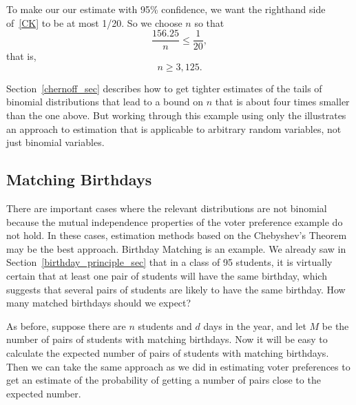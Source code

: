 To make our our estimate with 95\% confidence, we want the righthand
side of~\eqref{CK} to be at most 1/20.  So we choose $n$ so that
\[
\frac{156.25}{n} \leq \frac{1}{20},
\]
that is,
\[
n \geq 3,125.
\]

Section~\ref{chernoff_sec} describes how to get tighter estimates of
the tails of binomial distributions that lead to a bound on $n$ that
is about four times smaller than the one above.  But working through
this example using only the  illustrates an approach to
estimation that is applicable to arbitrary random variables, not just
binomial variables.  \iffalse , and it did lead to a feasible, though
larger than necessary, sample size.\fi

\subsection{Matching Birthdays}\label{bday_deviation_subsec}

There are important cases where the relevant distributions are not
binomial because the mutual independence properties of the voter
preference example do not hold.  In these cases, estimation methods
based on the Chebyshev's Theorem may be the best approach.  Birthday
Matching is an example.  We already saw in
Section~\ref{birthday_principle_sec} that in a class of 95 students,
it is virtually certain that at least one pair of students will have
the same birthday, which suggests that several pairs of students are
likely to have the same birthday.  How many matched birthdays should
we expect?

As before, suppose there are $n$ students and $d$ days in the year,
and let $M$ be the number of pairs of students with matching birthdays.
Now it will be easy to calculate the expected number of pairs of
students with matching birthdays.  Then we can take the same approach
as we did in estimating voter preferences to get an estimate of the
probability of getting a number of pairs close to the expected number.

